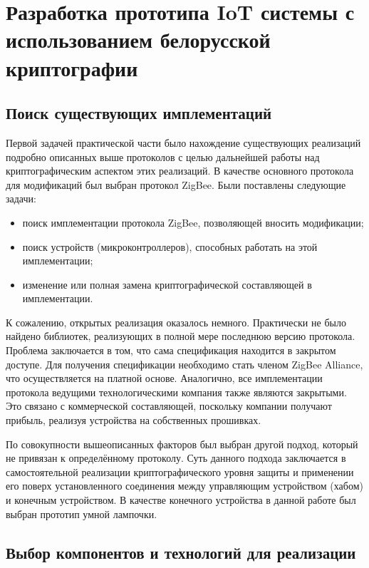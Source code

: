 \chapter{Разработка прототипа IoT системы с использованием белорусской криптографии}

	\section{Поиск существующих имплементаций}
	
	Первой задачей практической части было нахождение существующих реализаций подробно описанных
	выше протоколов с целью дальнейшей работы над криптографическим аспектом этих реализаций.
	В качестве основного протокола для модификаций был выбран протокол ZigBee. Были поставлены
	следующие задачи:
	
	\begin{itemize}
		\item поиск имплементации протокола ZigBee, позволяющей вносить модификации; 
		\item поиск устройств (микроконтроллеров), способных работать на этой имплементации;
		\item изменение или полная замена криптографической составляющей в имплементации.
	\end{itemize}

	К сожалению, открытых реализация оказалось немного. Практически не было найдено библиотек,
	реализующих в полной мере последнюю версию протокола. Проблема заключается в том, что сама
	спецификация находится в закрытом доступе. Для получения спецификации необходимо стать
	членом ZigBee Alliance, что осуществляется на платной основе. Аналогично, все имплементации
	протокола ведущими технологическими компания также являются закрытыми. Это связано с
	коммерческой составляющей, поскольку компании получают прибыль, реализуя устройства
	на собственных прошивках.
	
	По совокупности вышеописанных факторов был выбран другой подход, который не привязан
	к определённому протоколу. Суть данного подхода заключается в самостоятельной реализации
	криптографического уровня защиты и применении его поверх установленного соединения между
	управляющим устройством (хабом) и конечным устройством. В качестве конечного устройства
	в данной работе был выбран прототип умной лампочки.
	
	
	\section{Выбор компонентов и технологий для реализации}
	
